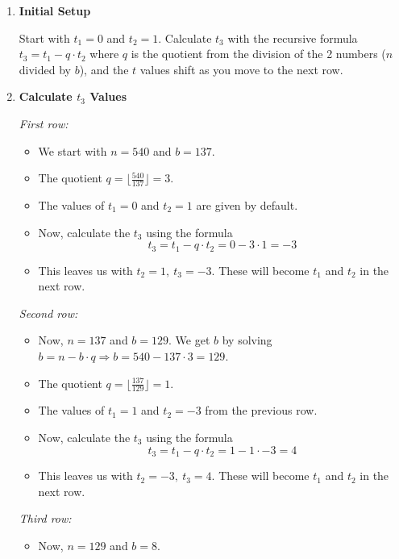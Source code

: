 \begin{enumerate}[label=\arabic*.]
    \item \textbf{Initial Setup}

          Start with \(t_1 = 0\) and \(t_2 = 1\). Calculate \(t_3\) with the recursive formula \(t_3 = t_1 - q \cdot t_2\) where \(q\) is the quotient from the division of the 2 numbers (\(n\) divided by \(b\)), and the \(t\) values shift as you move to the next row.

    \item \textbf{Calculate \(t_3\) Values}

          \textit{First row:}
          \begin{itemize}
              \item We start with \(n = 540\) and \(b = 137\).
              \item The quotient \(q = \lfloor \frac{540}{137} \rfloor = 3\).
              \item The values of \(t_1 = 0\) and \(t_2 = 1\) are given by default.
              \item Now, calculate the \(t_3\) using the formula
                    \[
                        t_3 = t_1 - q \cdot t_2 = 0 - 3 \cdot 1 = -3
                    \]
              \item This leaves us with \(t_2 = 1, \ t_3 = -3\). These will become \(t_1\) and \(t_2\) in the next row.
          \end{itemize}
          \textit{Second row:}
          \begin{itemize}
              \item Now, \(n = 137\) and \(b = 129\). We get \(b\) by solving \(b = n - b \cdot q \Rightarrow b = 540 - 137 \cdot 3 = 129\).
              \item The quotient \(q = \lfloor \frac{137}{129} \rfloor = 1\).
              \item The values of \(t_1 = 1\) and \(t_2 = -3\) from the previous row.
              \item Now, calculate the \(t_3\) using the formula
                    \[
                        t_3 = t_1 - q \cdot t_2 = 1 - 1 \cdot -3 = 4
                    \]
              \item This leaves us with \(t_2 = -3, \ t_3 = 4\). These will become \(t_1\) and \(t_2\) in the next row.
          \end{itemize}
          \textit{Third row:}
          \begin{itemize}
              \item Now, \(n = 129\) and \(b = 8\).

\end{itemize}
\end{enumerate}
